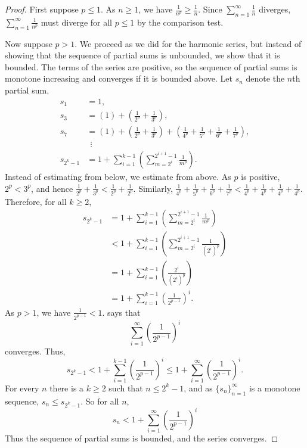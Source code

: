 \begin{proof}
First suppose $p \leq 1$.
As $n \geq 1$, we have
$\frac{1}{n^p} \geq \frac{1}{n}$.  Since
$\sum_{n=1}^\infty \frac{1}{n}$ diverges,
$\sum_{n=1}^\infty \frac{1}{n^p}$ must diverge for all $p \leq 1$ by the comparison test.

Now suppose $p > 1$.
We proceed as we did for the
harmonic series, but instead of showing that the sequence
of partial sums is unbounded, we show that it is bounded.
The terms of the series are positive, so the sequence of partial sums
is monotone increasing and converges if it is bounded
above.
Let $s_n$ denote the $n$th partial sum.
\begin{align*}
 s_1 & = 1 , \\
 s_3 & = \left( 1 \right) + \left( \frac{1}{2^p} + \frac{1}{3^p} \right) , \\
 s_7 & = \left( 1 \right) + \left( \frac{1}{2^p} + \frac{1}{3^p} \right) +
        \left( \frac{1}{4^p} + \frac{1}{5^p} + \frac{1}{6^p} + \frac{1}{7^p} \right) , \\
& ~~ \vdots \\
 s_{2^k - 1} &= 
1 + 
\sum_{i=1}^{k-1}
\left(
\sum_{m=2^i}^{2^{i+1}-1} \frac{1}{m^p}
\right) .
\end{align*}
Instead of estimating from below, we estimate from above.
As $p$ is positive, $2^p < 3^p$, and hence
$\frac{1}{2^p} + \frac{1}{3^p} <
\frac{1}{2^p} + \frac{1}{2^p}$.  Similarly,
$\frac{1}{4^p} + \frac{1}{5^p} +
\frac{1}{6^p} + \frac{1}{7^p} <
\frac{1}{4^p} + \frac{1}{4^p} +
\frac{1}{4^p} + \frac{1}{4^p}$.  Therefore,
for all $k \geq 2$,
\begin{equation*}
\begin{split}
s_{2^k-1}
& =
1+
\sum_{i=1}^{k-1}
\left(
\sum_{m=2^{i}}^{2^{i+1}-1} \frac{1}{m^p}
\right) 
\\
& <
1+
\sum_{i=1}^{k-1}
\left(
\sum_{m=2^{i}}^{2^{i+1}-1} \frac{1}{{(2^i)}^p}
\right) 
\\
& =
1+
\sum_{i=1}^{k-1}
\left(
\frac{2^i}{{(2^i)}^p}
\right) 
\\
& =
1+
\sum_{i=1}^{k-1}
{\left(
\frac{1}{2^{p-1}}
\right)}^i .
\end{split}
\end{equation*}
As $p > 1$, we have $\frac{1}{2^{p-1}} < 1$.
 says that
\begin{equation*}
\sum_{i=1}^\infty
{\left(
\frac{1}{2^{p-1}}
\right)}^i
\end{equation*}
converges.  Thus,
\begin{equation*}
s_{2^k-1} < 
1+
\sum_{i=1}^{k-1}
{\left(
\frac{1}{2^{p-1}}
\right)}^i 
\leq 
1+
\sum_{i=1}^\infty
{\left(
\frac{1}{2^{p-1}}
\right)}^i .
\end{equation*}
For every $n$ there is a $k \geq 2$ such that $n \leq 2^k-1$, and
as $\{ s_n \}_{n=1}^\infty$ is a monotone sequence, $s_n \leq s_{2^k-1}$.
So for all $n$,
\begin{equation*}
s_n < 
1+
\sum_{i=1}^\infty
{\left(
\frac{1}{2^{p-1}}
\right)}^i
\end{equation*}
Thus the sequence of partial sums is bounded, and the series converges.
\end{proof}

